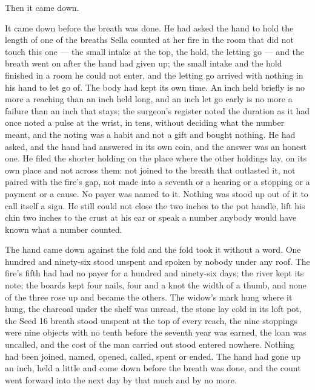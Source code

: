 Then it came down.

It came down before the breath was done. He had asked the hand to hold the length of one of the breaths Sella counted at her fire in the room that did not touch this one --- the small intake at the top, the hold, the letting go --- and the breath went on after the hand had given up; the small intake and the hold finished in a room he could not enter, and the letting go arrived with nothing in his hand to let go of. The body had kept its own time. An inch held briefly is no more a reaching than an inch held long, and an inch let go early is no more a failure than an inch that stays; the surgeon's register noted the duration as it had once noted a pulse at the wrist, in tens, without deciding what the number meant, and the noting was a habit and not a gift and bought nothing. He had asked, and the hand had answered in its own coin, and the answer was an honest one. He filed the shorter holding on the place where the other holdings lay, on its own place and not across them: not joined to the breath that outlasted it, not paired with the fire's gap, not made into a seventh or a hearing or a stopping or a payment or a cause. No payer was named to it. Nothing was stood up out of it to call itself a sign. He still could not close the two inches to the pot handle, lift his chin two inches to the crust at his ear or speak a number anybody would have known what a number counted.

The hand came down against the fold and the fold took it without a word. One hundred and ninety-six stood unspent and spoken by nobody under any roof. The fire's fifth had had no payer for a hundred and ninety-six days; the river kept its note; the boards kept four nails, four and a knot the width of a thumb, and none of the three rose up and became the others. The widow's mark hung where it hung, the charcoal under the shelf was unread, the stone lay cold in its loft pot, the Seed 16 breath stood unspent at the top of every reach, the nine stoppings were nine objects with no tenth before the seventh year was earned, the loan was uncalled, and the cost of the man carried out stood entered nowhere. Nothing had been joined, named, opened, called, spent or ended. The hand had gone up an inch, held a little and come down before the breath was done, and the count went forward into the next day by that much and by no more.
